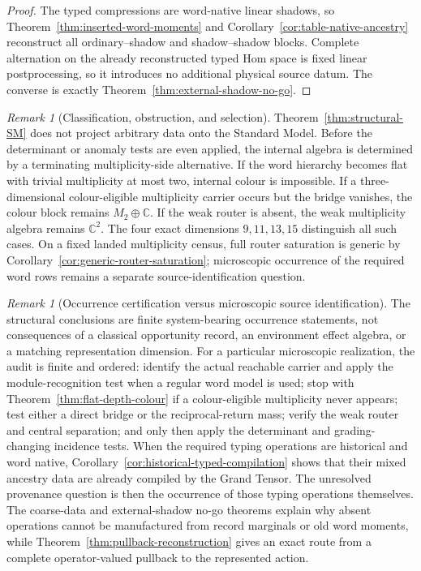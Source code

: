 \documentclass[11pt]{article}
\theoremstyle{definition}
\theoremstyle{remark}
\newtheorem{remark}[theorem]{Remark}
\newcommand{\C}{\mathbb C}
\begin{document}
\begin{proof}
The typed compressions are word-native linear shadows, so
Theorem~\ref{thm:inserted-word-moments} and
Corollary~\ref{cor:table-native-ancestry} reconstruct all ordinary--shadow and
shadow--shadow blocks.  Complete alternation on the already reconstructed typed
Hom space is fixed linear postprocessing, so it introduces no additional
physical source datum.  The converse is exactly
Theorem~\ref{thm:external-shadow-no-go}.
\end{proof}

\begin{remark}[Classification, obstruction, and selection]
Theorem~\ref{thm:structural-SM} does not project arbitrary data onto the
Standard Model.  Before the determinant or anomaly tests are even applied,
the internal algebra is determined by a terminating multiplicity-side
alternative.  If the word hierarchy becomes flat with trivial multiplicity at
most two, internal colour is impossible.  If a three-dimensional colour-eligible
multiplicity carrier occurs but the bridge vanishes, the colour block remains
$M_2\oplus\C$.  If the weak router is absent, the weak multiplicity algebra
remains $\C^2$.  The four exact dimensions $9,11,13,15$ distinguish all such
cases.  On a fixed landed multiplicity census, full router saturation is
generic by Corollary~\ref{cor:generic-router-saturation}; microscopic occurrence
of the required word rows remains a separate source-identification question.
\end{remark}

\begin{remark}[Occurrence certification versus microscopic source identification]
\label{rem:occurrence-vs-identification}
The structural conclusions are finite system-bearing occurrence statements,
not consequences of a classical opportunity record, an environment effect
algebra, or a matching representation dimension.  For a particular
microscopic realization, the audit is finite and ordered: identify the actual
reachable carrier and apply the module-recognition test when a regular word
model is used; stop with Theorem~\ref{thm:flat-depth-colour} if a colour-eligible
multiplicity never appears; test either a direct bridge or the reciprocal-return
mass; verify the weak router and central separation; and only then apply the
determinant and grading-changing incidence tests.  When the required typing
operations are historical and word native, Corollary~\ref{cor:historical-typed-compilation}
shows that their mixed ancestry data are already compiled by the Grand Tensor.
The unresolved provenance question is then the occurrence of those typing
operations themselves.  The coarse-data and external-shadow no-go theorems
explain why absent operations cannot be manufactured from record marginals or
old word moments, while Theorem~\ref{thm:pullback-reconstruction} gives an
exact route from a complete operator-valued pullback to the represented action.
\end{remark}
\end{document}
